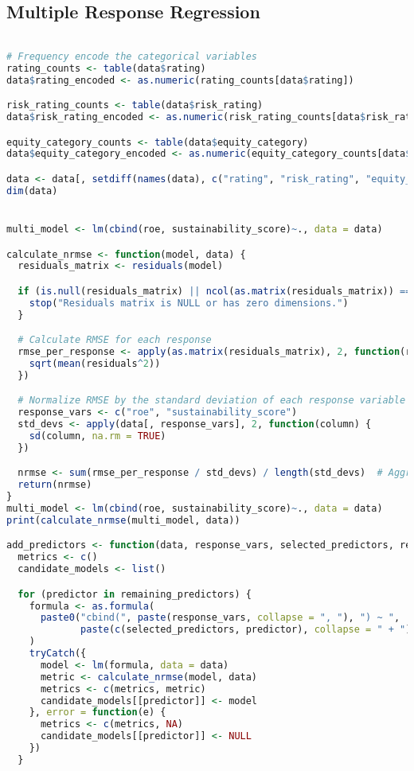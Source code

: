 \subsection{Multiple Response Regression}
\begin{lstlisting}[language=R, breaklines=true, basicstyle=\ttfamily\small, columns=fullflexible]

# Frequency encode the categorical variables
rating_counts <- table(data$rating)
data$rating_encoded <- as.numeric(rating_counts[data$rating])

risk_rating_counts <- table(data$risk_rating)
data$risk_rating_encoded <- as.numeric(risk_rating_counts[data$risk_rating])

equity_category_counts <- table(data$equity_category)
data$equity_category_encoded <- as.numeric(equity_category_counts[data$equity_category])

data <- data[, setdiff(names(data), c("rating", "risk_rating", "equity_category"))]
dim(data)


multi_model <- lm(cbind(roe, sustainability_score)~., data = data)

calculate_nrmse <- function(model, data) {
  residuals_matrix <- residuals(model)

  if (is.null(residuals_matrix) || ncol(as.matrix(residuals_matrix)) == 0) {
    stop("Residuals matrix is NULL or has zero dimensions.")
  }

  # Calculate RMSE for each response
  rmse_per_response <- apply(as.matrix(residuals_matrix), 2, function(residuals) {
    sqrt(mean(residuals^2))
  })

  # Normalize RMSE by the standard deviation of each response variable
  response_vars <- c("roe", "sustainability_score")
  std_devs <- apply(data[, response_vars], 2, function(column) {
    sd(column, na.rm = TRUE)
  })

  nrmse <- sum(rmse_per_response / std_devs) / length(std_devs)  # Aggregate across responses
  return(nrmse)
}
multi_model <- lm(cbind(roe, sustainability_score)~., data = data)
print(calculate_nrmse(multi_model, data))

add_predictors <- function(data, response_vars, selected_predictors, remaining_predictors) {
  metrics <- c()
  candidate_models <- list()

  for (predictor in remaining_predictors) {
    formula <- as.formula(
      paste0("cbind(", paste(response_vars, collapse = ", "), ") ~ ",
             paste(c(selected_predictors, predictor), collapse = " + "))
    )
    tryCatch({
      model <- lm(formula, data = data)
      metric <- calculate_nrmse(model, data)
      metrics <- c(metrics, metric)
      candidate_models[[predictor]] <- model
    }, error = function(e) {
      metrics <- c(metrics, NA)
      candidate_models[[predictor]] <- NULL
    })
  }


\end{lstlisting}
